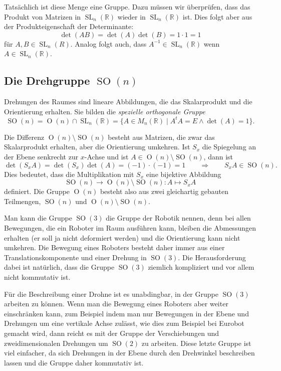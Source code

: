 Tatsächlich ist diese Menge eine Gruppe.
Dazu müssen wir überprüfen, dass das Produkt von Matrizen in
$\operatorname{SL}_n(\mathbb R)$
wieder in
$\operatorname{SL}_n(\mathbb R)$
ist.
Dies folgt aber aus der Produkteigenschaft der Determinante:
\[
\det(AB) 
=
\det(A) \det(B)
=
1\cdot 1
=
1
\]
für $A,B\in\operatorname{SL}_n(R)$.
Analog folgt auch, dass $A^{-1}\in\operatorname{SL}_n(\mathbb R)$ wenn
$A\in\operatorname{SL}_n(\mathbb R)$.

%
%
\subsection{Die Drehgruppe $\operatorname{SO}(n)$}
Drehungen des Raumes sind lineare Abbildungen, die 
das Skalarprodukt und die Orientierung erhalten.
Sie bilden die {\em spezielle orthogonale Gruppe}
\[
\operatorname{SO}(n) 
=
\operatorname{O}(n) \cap \operatorname{SL}_n(\mathbb R)
=
\{
A\in M_n(\mathbb R)\;|\; A^tA=E\wedge \det(A) = 1
\}.
\]

Die Differenz $\operatorname{O}(n) \setminus \operatorname{SO}(n)$
besteht aus Matrizen, die zwar das Skalarprodukt erhalten, aber die
Orientierung umkehren.
Ist $S_x$ die Spiegelung an der Ebene senkrecht zur $x$-Achse und ist
$A\in \operatorname{O}(n) \setminus \operatorname{SO}(n)$, dann ist
\[
\det(S_xA)= \det(S_x)\det(A) = (-1)\cdot(-1)=1
\qquad\Rightarrow\qquad
S_xA\in\operatorname{SO}(n).
\]
Dies bedeutet, dass die Multiplikation mit $S_x$ eine bijektive Abbildung
\[
\operatorname{SO}(n) \to \operatorname{O}(n)\setminus\operatorname{SO}(n)
:
A\mapsto S_xA
\]
definiert.
Die Gruppe $\operatorname{O}(n)$ besteht also aus zwei gleichartig gebauten
Teilmengen, $\operatorname{SO}(n)$  und
$\operatorname{O}(n)\setminus\operatorname{SO}(n)$.

Man kann die Gruppe $\operatorname{SO}(3)$ die Gruppe der Robotik nennen,
denn bei allen Bewegungen, die ein Roboter im Raum ausführen kann,
bleiben die Abmessungen erhalten (er soll ja nicht deformiert werden)
und die Orientierung kann nicht umkehren.
Die Bewegung eines Roboters besteht daher immer aus einer
Translationskomponente und einer Drehung in $\operatorname{SO}(3)$.
Die Herausforderung dabei ist natürlich, dass die Gruppe
$\operatorname{SO}(3)$ ziemlich kompliziert und vor allem nicht
kommutativ ist.

Für die Beschreibung einer Drohne ist es unabdingbar, in der
Gruppe $\operatorname{SO}(3)$ arbeiten zu können.
Wenn man die Bewegung eines Roboters aber weiter einschränken kann,
zum Beispiel indem man nur Bewegungen in der Ebene und Drehungen
um eine vertikale Achse zulässt, wie dies zum Beispiel bei
Eurobot gemacht wird, dann reicht es mit der Gruppe der Verschiebungen
und zweidimensionalen Drehungen um $\operatorname{SO}(2)$ zu arbeiten.
Diese letzte Gruppe ist viel einfacher, da sich Drehungen in der Ebene
durch den Drehwinkel beschreiben lassen und die Gruppe daher kommutativ ist.

